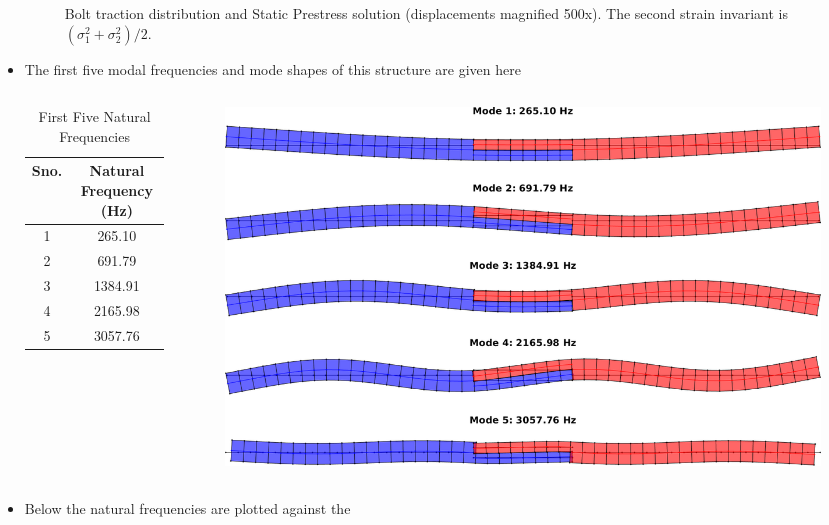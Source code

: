 \documentclass[aspectratio=169]{beamertmd}
\begin{document}
\begin{frame}[allowframebreaks]
\begin{itemize}
\begin{figure}[!h]
      \caption{Bolt traction distribution and Static Prestress
        solution (displacements magnified 500x). The second strain
        invariant is $(\sigma_1^2+\sigma_2^2)/2$.}
    \end{figure}
    \pagebreak
  \item The first five modal frequencies and mode shapes of this
    structure are given here
    \begin{columns}
      \begin{column}{0.5\linewidth}
        \begin{table}[!h]
          \centering
          \begin{tabular}{cc}
            \hline\hline
            Sno. & Natural Frequency (Hz)\\\hline
            1 & 265.10\\
            2 & 691.79\\
            3 & 1384.91\\
            4 & 2165.98\\
            5 & 3057.76\\\hline\hline
          \end{tabular}
          \caption{First Five Natural Frequencies}
        \end{table}
      \end{column}
      \begin{column}{0.5\linewidth}
        \begin{figure}[!h]
          \centering
          \includegraphics[width=\linewidth]{../../PLANARMODEL/FIGS/8IN_PRESLINMDS}
        \end{figure}
      \end{column}
    \end{columns}
    \pagebreak
  \item Below the natural frequencies are plotted against the

\end{itemize}
\end{frame}
\end{document}
